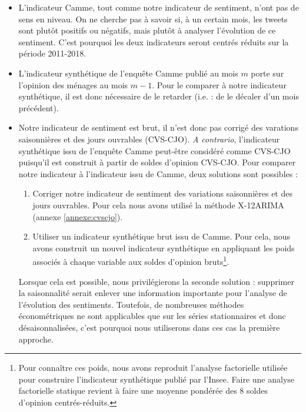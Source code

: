 \documentclass[11pt,french,french]{article}
\let\rmarkdownfootnote\footnote%
\def\footnote{\protect\rmarkdownfootnote}
\begin{document}
\begin{itemize}
\item
  L'indicateur Camme, tout comme notre indicateur de sentiment, n'ont pas de sens en niveau. On ne cherche pas à savoir si, à un certain mois, les tweets sont plutôt positifs ou négatifs, mais plutôt à analyser l'évolution de ce sentiment.
  C'est pourquoi les deux indicateurs seront centrés réduits sur la période 2011-2018.
\item
  L'indicateur synthétique de l'enquête Camme publié au mois \(m\) porte sur l'opinion des ménages au mois \(m-1\).
  Pour le comparer à notre indicateur synthétique, il est donc nécessaire de le retarder (i.e. : de le décaler d'un mois précédent).
\item
  Notre indicateur de sentiment est brut, il n'est donc pas corrigé des varations saisonnières et des jours ouvrables (CVS-CJO).
  \emph{A contrario}, l'indicateur synthétique issu de l'enquête Camme peut-être considéré comme CVS-CJO puisqu'il est construit à partir de soldes d'opinion CVS-CJO. Pour comparer notre indicateur à l'indicateur issu de Camme, deux solutions sont possibles :

  \begin{enumerate}
  \def\labelenumi{\arabic{enumi}.}
  \item
    Corriger notre indicateur de sentiment des variations saisonnières et des jours ouvrables.
    Pour cela nous avons utilisé la méthode X-12ARIMA (annexe \ref{annexe:cvscjo}).
  \item
    Utiliser un indicateur synthétique brut issu de Camme.
    Pour cela, nous avons construit un nouvel indicateur synthétique en appliquant les poids associés à chaque variable aux soldes d'opinion bruts\footnote{Pour connaître ces poids, nous avons reproduit l'analyse factorielle utilisée pour construire l'indicateur synthétique publié par l'Insee. Faire une analyse factorielle statique revient à faire une moyenne pondérée des 8 soldes d'opinion centrés-réduits.}.
  \end{enumerate}

  Lorsque cela est possible, nous privilégierons la seconde solution : supprimer la saisonnalité serait enlever une information importante pour l'analyse de l'évolution des sentiments.
  Toutefois, de nombreuses méthodes économétriques ne sont applicables que sur les séries stationnaires et donc désaisonnalisées, c'est pourquoi nous utiliserons dans ces cas la première approche.
\end{itemize}
\end{document}
